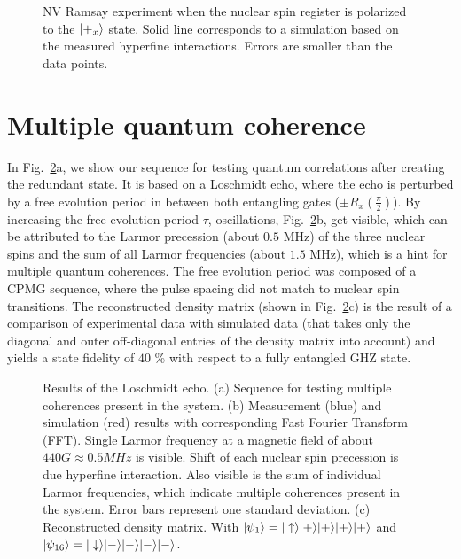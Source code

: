 \documentclass[aps,prl,floatfix,twocolumn,footinbib,superscriptaddress]{revtex4-1}
\begin{document}
\begin{figure}
\centerline{}
\caption{NV Ramsay experiment when the nuclear spin register is polarized to the $|+_x\rangle$ state. Solid line corresponds to a simulation based on the measured hyperfine interactions. Errors are smaller than the data points.}
\label{fig:S3}
\end{figure}

\section{Multiple quantum coherence}

In Fig.~\ref{fig:S4}a, we show our sequence for testing quantum correlations after creating the redundant state. It is based on a Loschmidt echo, where the echo is perturbed by a free evolution period in between both entangling gates ($\pm R_x(\frac{\pi}{2})$). By increasing the free evolution period $\tau$, oscillations, Fig.~\ref{fig:S4}b, get visible, which can be attributed to the Larmor precession (about $0.5$ MHz) of the three nuclear spins and the sum of all Larmor frequencies (about $1.5$ MHz), which is a hint for multiple quantum coherences. The free evolution period was composed of a CPMG sequence, where the pulse spacing did not match to nuclear spin transitions. The reconstructed density matrix (shown in Fig.~\ref{fig:S4}c) is the result of a comparison of experimental data with simulated data (that takes only the diagonal and outer off-diagonal entries of the density matrix into account) and yields a state fidelity of $40$ \% with respect to a fully entangled GHZ state. 

\begin{figure}
\centerline{}
\caption{Results of the Loschmidt echo. (a) Sequence for testing multiple coherences present in the system. (b) Measurement (blue) and simulation (red) results with corresponding Fast Fourier Transform (FFT). Single Larmor frequency at a magnetic field of about $440G\approx 0.5 MHz$ is visible. Shift of each nuclear spin precession is due hyperfine interaction. Also visible is the sum of individual Larmor frequencies, which indicate multiple coherences present in the system. Error bars represent one standard deviation. (c) Reconstructed density matrix. With $|\psi_1\rangle=|\uparrow\rangle|+\rangle|+\rangle|+\rangle|+\rangle$ and  $|\psi_{16}\rangle=|\downarrow\rangle|-\rangle|-\rangle|-\rangle|-\rangle$.}
\label{fig:S4}
\end{figure}
\end{document}

